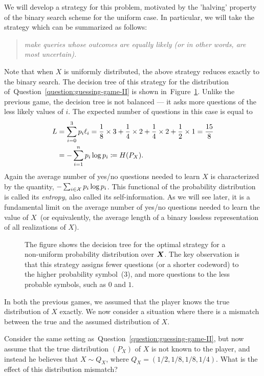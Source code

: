 \documentclass[12pt]{article}
\begin{document}
        We will develop a strategy for this problem, motivated by the 'halving' property of the binary search scheme for the uniform case. In particular, we will take the strategy which can be summarized as follows: 
        \begin{quote}
            \centering
                \emph{make queries whose outcomes are equally likely (or in other words, are most uncertain).}
        \end{quote}
        Note that when $X$ is uniformly distributed, the above strategy reduces exactly to the binary search. 
        The decision tree of this strategy for the distribution of~Question~\ref{question:guessing-game-II} is shown in~Figure~\ref{fig:guessing-game-II}. Unlike the previous game, the decision tree is not balanced --- it asks more questions of the less likely values of $i$. The expected number of questions in this case is equal to 
        \begin{align}
            L &= \sum_{i=0}^3 p_i \ell_i = \frac{1}{8}\times 3 + \frac{1}{4} \times 2  + \frac{1}{4} \times 2 + \frac{1}{2} \times 1 = \frac{15}{8} \\
            & = -\sum_{i=1}^n p_i \log p_i \coloneqq H(P_X). 
        \end{align}
        Again the average number of yes/no questions needed to learn $X$ is characterized by the quantity, $-\sum_{i \in \mathcal{X}} p_i \log p_i$. This functional of the probability distribution is called its \emph{entropy}, also called its self-information. As we will see later, it is a fundamental limit  on the average number of yes/no questions needed to learn the value of $X$~(or equivalently, the average length of a binary lossless representation of all realizations of $X$).   

        \begin{figure}[hbt!]
            \centering
            \def\figwidth{0.5\columnwidth}
            \def\figheight{0.25\columnwidth} %
            
            \label{fig:guessing-game-II}
            \caption{The figure shows the decision tree for the optimal strategy for a non-uniform probability distribution over ${\boldsymbol X}$. The key observation is that this strategy assigns fewer questions (or a shorter codeword) to the higher probability symbol~($3$), and more questions to the less probable symbols, such as $0$ and $1$.}
        \end{figure}

        In both the previous games, we assumed that the player knows the true distribution of $X$ exactly. We now consider a situation where there is a mismatch between the true and the assumed distribution of $X$. 
        \begin{question}
            \label{question:guessing-game-III}
            Consider the same setting as~Question~\ref{question:guessing-game-II}, but now assume that the true distribution $(P_X)$ of $X$ is not known to the player, and instead he believes that $X \sim Q_X$, where $Q_X = (1/2, 1/8, 1/8, 1/4)$. What is the effect of this distribution mismatch? 
        \end{question}
\end{document}
